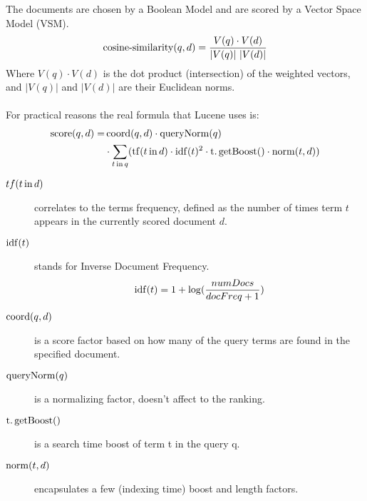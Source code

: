 The documents are chosen by a Boolean Model and are scored by a Vector Space
Model (VSM).
\[
	\operatorname{cosine-similarity}(q,d) = \frac{V(q) \cdot V(d)} {|V(q)|\ |V(d)|}
\]
%
Where \(V(q) \cdot V(d)\) is the dot product (intersection) of the weighted
vectors, and \(|V(q)|\) and \(|V(d)|\) are their Euclidean norms.\\
\\
For practical reasons the real formula that Lucene uses is:
%
\begin{equation*}
\begin{split}
	\operatorname{score}(q,d) = & \operatorname{coord}(q,d) \cdot \operatorname{queryNorm}(q) \\
	                   & \cdot \sum_{t \operatorname{in} q} (
	                             \operatorname{tf}(t\operatorname{in}d) \cdot
	                             \operatorname{idf}(t)^{2} \cdot
	                             \operatorname{t.getBoost}() \cdot
	                             \operatorname{norm}(t,d)
	                           )
\end{split}
\end{equation*}
%
\begin{description}

\item[\(tf(t\operatorname{in}d)\)]
correlates to the terms frequency, defined as the number of times term \(t\)
appears in the currently scored document \(d\).

\item[\(\operatorname{idf}(t)\)]
stands for Inverse Document Frequency.
\[
	\operatorname{idf}(t) = 1 + \log(\frac{numDocs}{docFreq + 1})
\]

\item[\(\operatorname{coord}(q,d)\)]
is a score factor based on how many of the query terms are found in the
specified document.

\item[\(\operatorname{queryNorm}(q)\)]
is a normalizing factor, doesn’t affect to the ranking.

\item[\(\operatorname{t.getBoost}()\)]
is a search time boost of term t in the query q.

\item[\(\operatorname{norm}(t,d)\)]
encapsulates a few (indexing time) boost and length factors.

\end{description}

